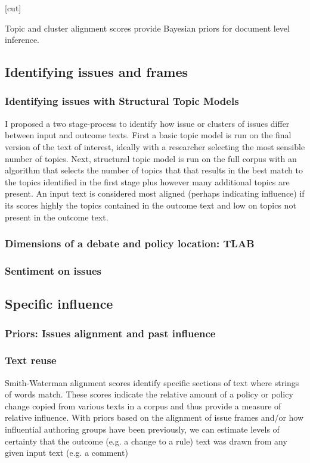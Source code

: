[cut]

 Topic and cluster alignment scores provide Bayesian priors for document level inference.

\subsection{Identifying issues and frames}
\subsubsection{Identifying issues with Structural Topic Models}
I proposed a two stage-process to identify how issue or clusters of issues differ between input and outcome texts. First a basic topic model is run on the final version of the text of interest, ideally with a researcher selecting the most sensible number of topics. Next, structural topic model is run on the full corpus with an algorithm that selects the number of topics that that results in the best match to the topics identified in the first stage plus however many additional topics are present. An input text is considered most aligned (perhaps indicating influence) if its scores highly the topics contained in the outcome text and low on topics not present in the outcome text.
\subsubsection{Dimensions of a debate and policy location: TLAB}
\subsubsection{Sentiment on issues}

\subsection{Specific influence}
\subsubsection{Priors: Issues alignment and past influence}
\subsubsection{Text reuse}
Smith-Waterman alignment scores identify specific sections of text where strings of words match. These scores indicate the relative amount of a policy or policy change copied from various texts in a corpus and thus provide a measure of relative influence. With priors based on the alignment of issue frames and/or how influential authoring groups have been previously, we can estimate levels of certainty that the outcome (e.g. a change to a rule) text was drawn from any given input text (e.g. a comment)

